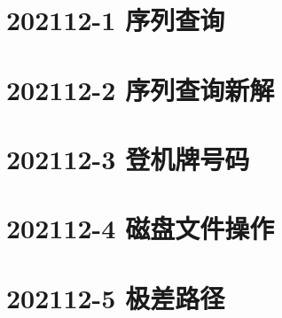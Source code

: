 \documentclass[cn,10pt,math=newtx,citestyle=gb7714-2015,bibstyle=gb7714-2015]{elegantbook}
\newif\ifonlyanalyze %
\begin{document}
\newpage
\section{202112-1 序列查询}
\ifonlyanalyze
\else
  
\fi


\newpage
\section{202112-2 序列查询新解}
\ifonlyanalyze
\else
  
\fi


\newpage
\section{202112-3 登机牌号码}
\ifonlyanalyze
\else
  
\fi


\newpage
\section{202112-4 磁盘文件操作}
\ifonlyanalyze
\else
  
\fi


\newpage
\section{202112-5 极差路径}
\ifonlyanalyze
\else
  
\fi

\end{document}
